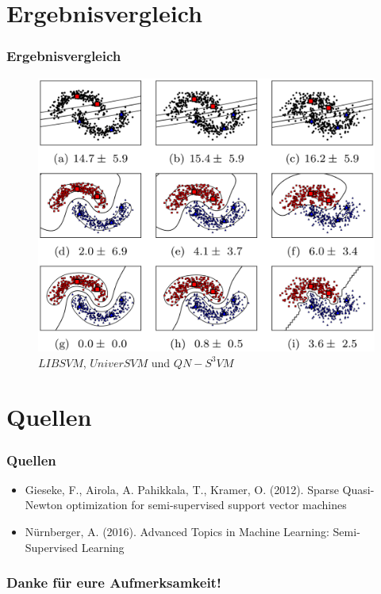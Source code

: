 \documentclass{beamer}
\begin{document}
\section{Ergebnisvergleich}

\begin{frame}
	\frametitle{Ergebnisvergleich}
	\begin{figure}
	\includegraphics[width=\linewidth,height=.7\textheight,keepaspectratio]{img/example_results.png}
    \caption{$LIBSVM$, $UniverSVM$ und $QN-S^3VM$}
	
	\end{figure}
\end{frame}


\section{Quellen}

\begin{frame}
\frametitle{Quellen}
\begin{itemize}
\item Gieseke, F., Airola, A. Pahikkala, T., Kramer, O. (2012). Sparse Quasi-Newton optimization for semi-supervised support vector machines
\item N\"urnberger, A. (2016). Advanced Topics in Machine Learning: Semi-Supervised Learning
\end{itemize}
\end{frame}


\begin{frame}
\frametitle{Danke f\"ur eure Aufmerksamkeit!}
\end{frame}
\end{document}

